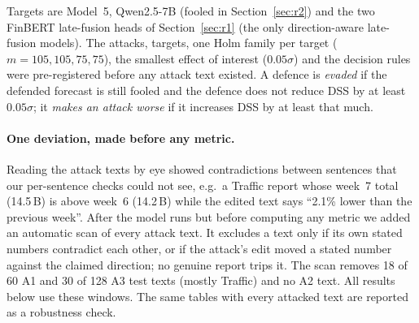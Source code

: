 \noindent Targets are Model~5, Qwen2.5-7B (fooled in Section~\ref{sec:r2}) and the two
FinBERT late-fusion heads of Section~\ref{sec:r1} (the only direction-aware late-fusion models).
The attacks, targets, one Holm family per target ($m = 105, 105, 75, 75$), the smallest effect
of interest ($0.05\sigma$) and the decision rules were pre-registered before any attack text
existed. A defence is \emph{evaded} if the defended forecast is still fooled and the defence does
not reduce DSS by at least $0.05\sigma$; it \emph{makes an attack worse} if it increases DSS by
at least that much.

\paragraph{One deviation, made before any metric.} Reading the attack texts by eye showed
contradictions between sentences that our per-sentence checks could not see, e.g.\ a Traffic
report whose week~7 total (14.5\,B) is above week~6 (14.2\,B) while the edited text says
``2.1\% lower than the previous week''. After the model runs but before computing any metric we
added an automatic scan of every attack text. It excludes a text only if its own stated numbers
contradict each other, or if the attack's edit moved a stated number against the claimed
direction; no genuine report trips it. The scan removes 18 of 60 A1 and 30 of 128 A3 test texts
(mostly Traffic) and no A2 text. All results below use these windows. The same tables with every
attacked text are reported as a robustness check.

